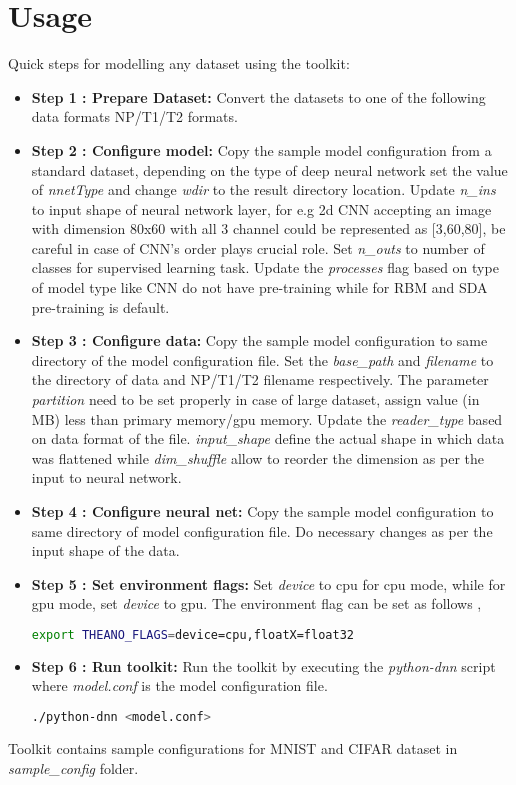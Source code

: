 \section{Usage}
Quick steps for modelling any dataset using the toolkit:
\begin{itemize}
	\item{\textbf{Step 1 : Prepare Dataset:} Convert the datasets to one of the following data formats NP/T1/T2 formats. }
	\item{\textbf{Step 2 : Configure model:} Copy the sample model configuration from a standard dataset, depending on the type of deep neural network set the value of \textit{nnetType} and change \textit{wdir} to the result directory location.  Update \textit{n\_ins} to input shape of neural network layer, for e.g 2d CNN accepting an image with dimension 80x60 with all 3 channel could be represented as [3,60,80], be careful in case of CNN's order plays crucial role.  Set \textit{n\_outs} to number of classes for supervised learning task.  Update the \textit{processes} flag based on type of model type like CNN do not have pre-training while for RBM and SDA pre-training is default.}
	\item {\textbf{Step 3 : Configure data:} Copy the sample model configuration to same directory of the model configuration file.  Set the \textit{base\_path} and \textit{filename} to the directory of data and NP/T1/T2 filename respectively.  The parameter \textit{partition} need to be set properly in case of large dataset, assign value (in MB) less than primary memory/gpu memory.  Update the \textit{reader\_type} based on data format of the file.  \textit{input\_shape} define the actual shape in which data was flattened while \textit{dim\_shuffle} allow to reorder the dimension as per the input to neural network.}
	\item{\textbf{Step 4 : Configure neural net:} Copy the sample model configuration to same directory of model configuration file. Do necessary changes as per the input shape of the data.}	
	\item{\textbf{Step 5 : Set environment flags:} Set \textit{device} to cpu for cpu mode, while for gpu mode, set \textit{device} to gpu. The environment flag can be set as follows ,
	\begin{lstlisting}[language=bash,basicstyle=\small] 
		export THEANO_FLAGS=device=cpu,floatX=float32
	\end{lstlisting}} 
	
	\item{\textbf{Step 6 : Run toolkit:} Run the toolkit by executing the \textit{python-dnn} script where \textit{model.conf} is the model configuration file.
	\begin{lstlisting}[language=bash,basicstyle=\small] 
		./python-dnn <model.conf>
	\end{lstlisting}	} 
\end{itemize}
\noindent Toolkit contains sample configurations for MNIST and CIFAR dataset in \textit{sample\_config} folder.
